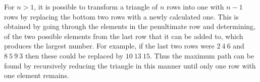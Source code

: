 \documentclass{article}
\begin{document}
For $n>1$, it is possible to transform a triangle of $n$ rows into one with $n-1$ rows by replacing the bottom two rows with a newly calculated one. This is obtained by going through the elements in the penultimate row and determining, of the two possible elements from the last row that it can be added to, which produces the largest number. For example, if the last two rows were $2\ 4\ 6$ and $8\ 5\ 9\ 3$ then these could be replaced by $10\ 13\ 15$. Thus the maximum path can be found by recursively reducing the triangle in this manner until only one row with one element remains.
\end{document}
